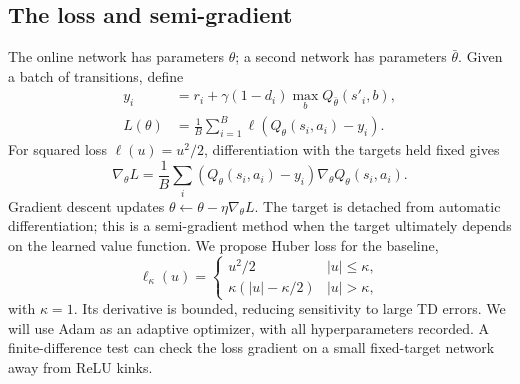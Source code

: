 \documentclass[11pt,a4paper]{article}
\begin{document}
\subsection{The loss and semi-gradient}
The online network has parameters $\theta$; a second network has parameters $\bar\theta$. Given a batch of transitions, define
\begin{align}
 y_i&=r_i+\gamma(1-d_i)\max_b Q_{\bar\theta}(s'_i,b),\label{eq:target}\\
 L(\theta)&=\frac1B\sum_{i=1}^B \ell(Q_\theta(s_i,a_i)-y_i).
\end{align}
For squared loss $\ell(u)=u^2/2$, differentiation with the targets held fixed gives
\[
 \nabla_\theta L=\frac1B\sum_i(Q_\theta(s_i,a_i)-y_i)\nabla_\theta Q_\theta(s_i,a_i).
\]
Gradient descent updates $\theta\leftarrow\theta-\eta\nabla_\theta L$. The target is detached from automatic differentiation; this is a semi-gradient method when the target ultimately depends on the learned value function. We propose Huber loss for the baseline,
\[
 \ell_\kappa(u)=\begin{cases}u^2/2&|u|\leq\kappa,\\
 \kappa(|u|-\kappa/2)&|u|>\kappa,\end{cases}
\]
with $\kappa=1$. Its derivative is bounded, reducing sensitivity to large TD errors. We will use Adam as an adaptive optimizer, with all hyperparameters recorded. A finite-difference test can check the loss gradient on a small fixed-target network away from ReLU kinks.
\end{document}
